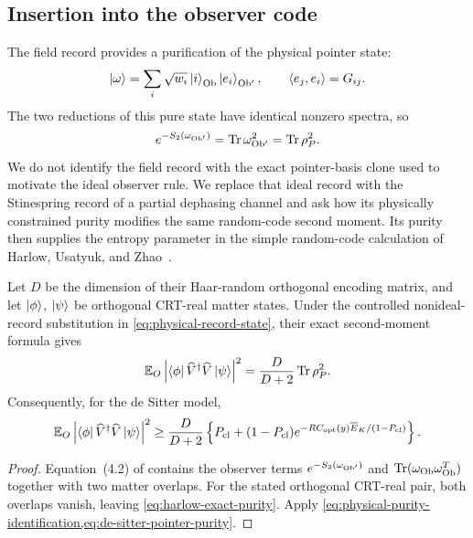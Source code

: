 \subsection{Insertion into the observer code}

The field record provides a purification of the physical pointer state:
\begin{equation}
 \left\lvert\omega\right\rangle=\sum_i\sqrt{w_i}\left\lvert i\right\rangle_{\rm Ob}\left\lvert e_i\right\rangle_{\rm Ob'},
 \qquad \left\langle e_j,e_i\right\rangle=G_{ij}.
 \label{eq:physical-record-state}
\end{equation}
The two reductions of this pure state have identical nonzero spectra, so
\begin{equation}
 e^{-S_2(\omega_{\rm Ob'})}
 =\operatorname{Tr}\omega_{\rm Ob'}^2
 =\operatorname{Tr}\rho_P^2.
 \label{eq:physical-purity-identification}
\end{equation}
We do not identify the field record with the exact pointer-basis clone used to
motivate the ideal observer rule.  We replace that ideal record with the
Stinespring record of a partial dephasing channel and ask how its physically
constrained purity modifies the same random-code second moment.  Its purity
then supplies the entropy parameter in the simple random-code calculation of
Harlow, Usatyuk, and Zhao~\cite{HarlowUsatyukZhao2025}.

\begin{proposition}
\label{prop:harlow-floor}
Let $D$ be the dimension of their Haar-random orthogonal encoding matrix, and
let $\left\lvert\phi\right\rangle$, $\left\lvert\psi\right\rangle$ be orthogonal CRT-real matter states.  Under the
controlled nonideal-record substitution in
\cref{eq:physical-record-state}, their exact second-moment formula gives
\begin{equation}
 \mathbb E_O\left\lvert\left\langle\phi\right\rvert\widehat V^\dagger\widehat V\left\lvert\psi\right\rangle\right\rvert^2
 =\frac{D}{D+2}\operatorname{Tr}\rho_P^2.
 \label{eq:harlow-exact-purity}
\end{equation}
Consequently, for the de Sitter model,
\begin{equation}
 \mathbb E_O\left\lvert\left\langle\phi\right\rvert\widehat V^\dagger\widehat V\left\lvert\psi\right\rangle\right\rvert^2
 \geq\frac{D}{D+2}\left\{P_{\rm cl}+(1-P_{\rm cl})
 e^{-R C_{\rm opt}(y)\overline E_{K}/(1-P_{\rm cl})}\right\}.
 \label{eq:harlow-physical-floor}
\end{equation}
\end{proposition}

\begin{proof}
Equation~(4.2) of \cite{HarlowUsatyukZhao2025} contains the observer terms
$e^{-S_2(\omega_{\rm Ob'})}$ and
$\operatorname{Tr}(\omega_{\rm Ob}\omega_{\rm Ob}^{T})$ together with two matter overlaps.
For the stated orthogonal CRT-real pair, both overlaps vanish, leaving
\cref{eq:harlow-exact-purity}.  Apply
\cref{eq:physical-purity-identification,eq:de-sitter-pointer-purity}.
\end{proof}


